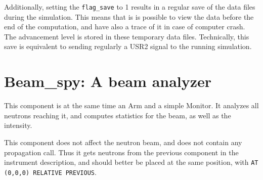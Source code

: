 Additionally, setting the \verb+flag_save+ to 1 results in
a regular save of the data files during the simulation.
This means that is is possible to view the data before the end
of the computation, and have also a trace of it in case of
computer crash. The advancement level is stored in these temporary
data files. Technically, this save is equivalent to sending regularly
a USR2 signal to the running simulation.

\section{Beam\_spy: A beam analyzer}

This component is at the same time an Arm and a simple Monitor. It analyzes all neutrons reaching it, and computes statistics for the beam, as well as the intensity.

This component does not affect the neutron beam, and does not contain any propagation call. Thus it gets neutrons from the previous component in the instrument description, and should better be placed at the same position, with \verb+AT (0,0,0) RELATIVE PREVIOUS+.
